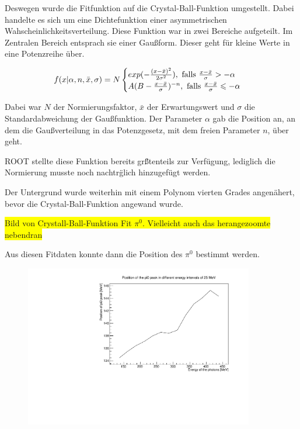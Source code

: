 \documentclass[a4paper,11pt,oneside,final,german,openbib,pdftex]{scrbook}
\begin{document}
{Deswegen wurde die Fitfunktion auf die Crystal-Ball-Funktion umgestellt. Dabei handelte es sich um eine Dichtefunktion einer asymmetrischen Wahscheinlichkeitsverteilung. Diese Funktion war in zwei Bereiche aufgeteilt. Im Zentralen Bereich entsprach sie einer Gau{\ss}form. Dieser geht f\"ur kleine Werte in eine Potenzreihe \"uber.

\begin{equation}
	f(x|\alpha,n,\bar{x},\sigma)=N\begin{cases}exp(-\frac{(x-\bar{x})^2}{2\sigma^2}), \textnormal{  falls $\frac{x-\bar{x}}{\sigma}> -\alpha$} \\
	A(B-\frac{x-\bar{x}}{\sigma})^{-n}, \textnormal{  falls $\frac{x-\bar{x}}{\sigma}\leqslant -\alpha$} 
	\end{cases}
	\label{eq:Crystal-Ball-Funktion}
\end{equation}

Dabei war $N$ der Normierungsfaktor, $\bar{x}$ der Erwartungswert und $\sigma$ die Standardabweichung der Gau{\ss}funktion. Der Parameter $\alpha$ gab die Position an, an dem die Gau{\ss}verteilung in das Potenzgesetz, mit dem freien Parameter $n$, \"uber geht\cite{NBI15}. 

ROOT stellte diese Funktion bereits gr\"{\ss}tenteils zur Verf\"ugung, lediglich die Normierung musste noch nachtr\"glich hinzugef\"ugt werden.

Der Untergrund wurde weiterhin mit einem Polynom vierten Grades angen\"ahert, bevor die Crystal-Ball-Funktion angewand wurde.

\colorbox{yellow}{Bild von Crystall-Ball-Funktion Fit $\pi^0$. Vielleicht auch das herangezoomte nebendran}

 Aus diesen Fitdaten konnte dann die Position des $\pi^0$ bestimmt werden. 
 
 \begin{figure}[h!]
 	\begin{center}
 		\includegraphics[width=100mm]{RealDataEnergyIntervalSymmetricPhotonsDeviation}
 	

\end{center}
\end{figure}}
\end{document}
